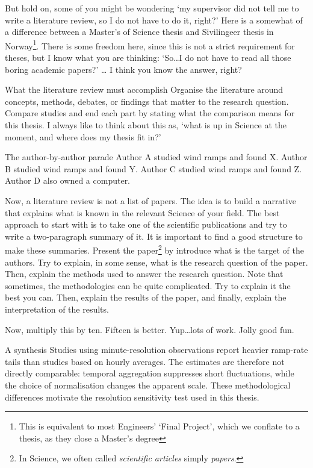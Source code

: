 \documentclass[masters,en,listoffigures,listoftables,acronyms]{NMBU}
\begin{document}
But hold on, some of you might be wondering `my supervisor did not tell me to write a literature review, so I do not have to do it, right?'
Here is a somewhat of a difference between a Master's of Science thesis and Sivilingeer thesis in Norway\footnote{This is equivalent to most Engineers' `Final Project', which we conflate to a thesis, as they close a Master's degree}.
There is some freedom here, since this is not a strict requirement for theses, but I know what you are thinking: `So\dots I do not have to read all those boring academic papers?'
\dots
I think you know the answer, right?



\begin{thesispoint}{What the literature review must accomplish}
Organise the literature around concepts, methods, debates, or findings that matter to the research question.
Compare studies and end each part by stating what the comparison means for this thesis.
I always like to think about this as, `what is up in Science at the moment, and where does my thesis fit in?'
\end{thesispoint}

\begin{avoidbox}{The author-by-author parade}
Author A studied wind ramps and found X. Author B studied wind ramps and found Y.
Author C studied wind ramps and found Z. Author D also owned a computer.
\end{avoidbox}

Now, a literature review is not a list of papers.
The idea is to build a narrative that explains what is known in the relevant Science of your field.
The best approach to start with is to take one of the scientific publications and try to write a two-paragraph summary of it.
It is important to find a good structure to make these summaries.
Present the paper\footnote{In Science, we often called \emph{scientific articles} simply \emph{papers}.} by introduce what is the target of the authors.
Try to explain, in some sense, what is the research question of the paper.
Then, explain the methods used to answer the research question.
Note that sometimes, the methodologies can be quite complicated.
Try to explain it the best you can.
Then, explain the results of the paper, and finally, explain the interpretation of the results.

Now, multiply this by ten. Fifteen is better. Yup\dots lots of work. Jolly good fun.


\begin{betterbox}{A synthesis}
Studies using minute-resolution observations report heavier ramp-rate tails than studies based on hourly averages.
The estimates are therefore not directly comparable: temporal aggregation suppresses short fluctuations, while the choice of normalisation changes the apparent scale. These methodological differences motivate the resolution sensitivity test used in this thesis.
\end{betterbox}
\end{document}

